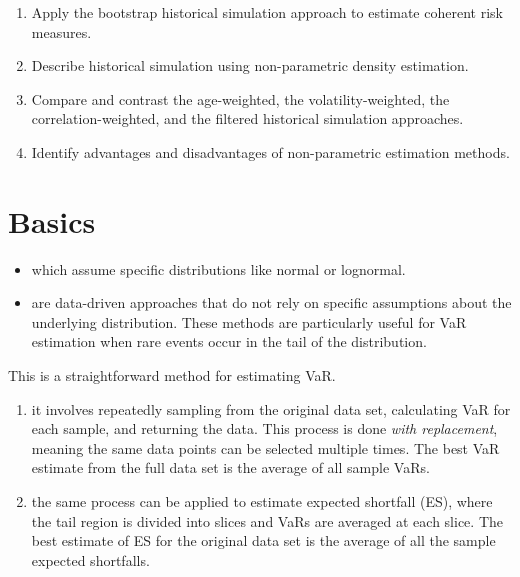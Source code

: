 
\begin{mrkeybox}[title={Learning objectives in this reading}]
\small
\begin{enumerate}[label=\textbf{\alph*.},leftmargin=1.7em]
\item Apply the bootstrap historical simulation approach to estimate coherent risk measures.
\item Describe historical simulation using non-parametric density estimation.
\item Compare and contrast the age-weighted, the volatility-weighted, the correlation-weighted,
      and the filtered historical simulation approaches.
\item Identify advantages and disadvantages of non-parametric estimation methods.
\end{enumerate}
\end{mrkeybox}

\section{Basics}
\begin{itemize}
\item {} which assume specific distributions like normal or lognormal.
\item {} are data-driven approaches that do not
      rely on specific assumptions about the underlying distribution. These methods are
      particularly useful for VaR estimation when rare events occur in the tail of the
      distribution.
\end{itemize}


 This is a straightforward method for estimating VaR.

\begin{enumerate}[label=\textbf{\alph*)},leftmargin=1.9em]
\item {} it involves repeatedly sampling from the original data set,
      calculating VaR for each sample, and returning the data. This process is done
      \textit{with replacement}, meaning the same data points can be selected multiple times.
      The best VaR estimate from the full data set is the average of all sample VaRs.
\item {} the same process can be applied to estimate expected shortfall (ES),
      where the tail region is divided into slices and VaRs are averaged at each slice. The best
      estimate of ES for the original data set is the average of all the sample expected
      shortfalls.
\end{enumerate}

